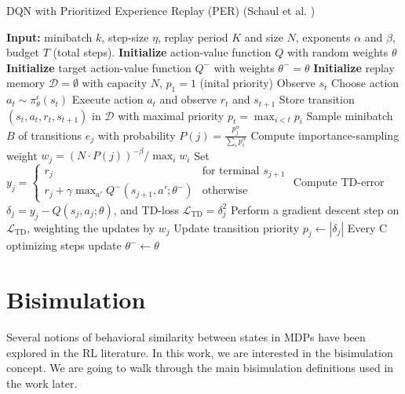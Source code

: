 \begin{algorithm}
\caption{DQN with Prioritized Experience Replay (PER) (Schaul et al. \cite{schaul2015prioritized})}
\label{algorithm:dqn_per}
\begin{algorithmic}[1]
\State \textbf{Input:} minibatch $k$, step-size $\eta$, replay period $K$ and size $N$, exponents $\alpha$ and $\beta$, budget $T$ (total steps).
\State \textbf{Initialize} action-value function $Q$ with random weights $\theta$
\State \textbf{Initialize} target action-value function $Q^-$ with weights $\theta^- = \theta$
\State \textbf{Initialize} replay memory $\mathcal{D} = \emptyset$ with capacity $N$, $p_1 = 1$ (inital priority) %
    \State Observe $s_t$
    \State Choose action $a_t \sim \pi^\epsilon_\theta(s_t)$
    \State Execute action $a_t$ and observe $r_t$ and $s_{t+1}$
    \State Store transition $(s_t, a_t, r_t, s_{t+1})$ in $\mathcal{D}$ with maximal priority $p_t = \max_{i < t} p_i$
        \State Sample minibatch $B$ of transitions $e_j$ with probability $P(j) = \frac{p_j^\alpha}{\sum_i p_i^\alpha}$    
        \State Compute importance-sampling weight $w_j = \left( N \cdot P(j) \right)^{-\beta} / \max_i w_i$
        \State Set $y_j = 
        \begin{cases} 
            r_j & \text{for terminal } s_{j+1}\\
            r_j + \gamma \max_{a'} Q^-(s_{j+1}, a'; \theta^-) & \text{otherwise}
        \end{cases}$
        \State Compute TD-error $\delta_j = y_j - Q(s_{j}, a_{j}; \theta)$, and TD-loss $\mathcal{L}_{\text{TD}} = \delta_j^2 $
        \State Perform a gradient descent step on $\mathcal{L}_{\text{TD}}$, weighting the updates by $w_j$
        \State Update transition priority $p_j \leftarrow |\delta_j|$
        \State Every C optimizing steps update $\theta^- \leftarrow \theta$
    \EndIf
\EndFor
\end{algorithmic}
\end{algorithm}



\section{Bisimulation}
\label{sec:bisimulation_background}

Several notions of behavioral similarity between states in MDPs have been explored in the RL literature. In this work, we are interested in the bisimulation concept. We are going to walk through the main bisimulation definitions used in the work later.

